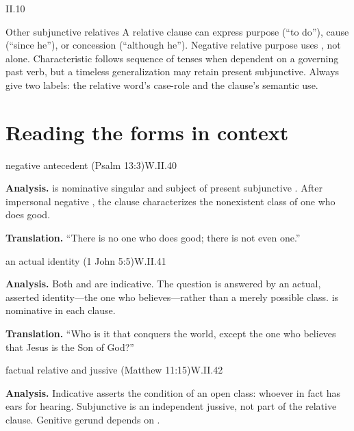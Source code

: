 \begin{courseunit}{II.10}
\begin{grammarbox}{Other subjunctive relatives}
A relative clause can express purpose (``to do''), cause (``since he''), or concession
(``although he'').  Negative relative purpose uses , not  alone.
Characteristic follows sequence of tenses when dependent on a governing past verb, but a
timeless generalization may retain present subjunctive.  Always give two labels: the relative
word's case-role and the clause's semantic use.
\end{grammarbox}

\section{Reading the forms in context}

\begin{workedexample}{negative antecedent (Psalm 13:3)}{W.II.40}

\textbf{Analysis.}   is nominative singular and subject of present subjunctive
.  After impersonal negative , the clause characterizes the
nonexistent class of one who does good.

\textbf{Translation.}  ``There is no one who does good; there is not even one.''
\end{workedexample}

\begin{workedexample}{an actual identity (1 John 5:5)}{W.II.41}

\textbf{Analysis.}  Both  and  are indicative.  The question is
answered by an actual, asserted identity---the one who believes---rather than a merely
possible class.   is nominative in each clause.

\textbf{Translation.}  ``Who is it that conquers the world, except the one who believes that
Jesus is the Son of God?''
\end{workedexample}

\begin{workedexample}{factual relative and jussive (Matthew 11:15)}{W.II.42}

\textbf{Analysis.}  Indicative  asserts the condition of an open class: whoever
in fact has ears for hearing.  Subjunctive  is an independent jussive, not part
of the relative clause.  Genitive gerund  depends on .


\end{workedexample}
\end{courseunit}

